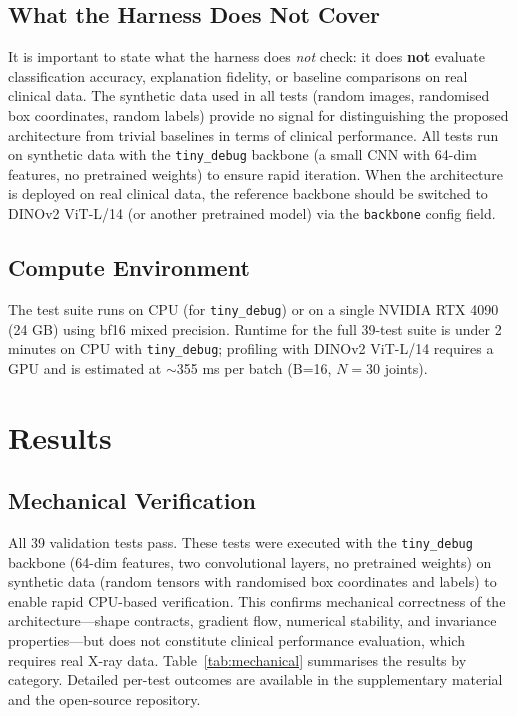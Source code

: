 \documentclass{article}
\begin{document}
\subsection{What the Harness Does Not Cover}
It is important to state what the harness does \emph{not} check: it does \textbf{not} evaluate classification accuracy, explanation fidelity, or baseline comparisons on real clinical data. The synthetic data used in all tests (random images, randomised box coordinates, random labels) provide no signal for distinguishing the proposed architecture from trivial baselines in terms of clinical performance. All tests run on synthetic data with the \texttt{tiny\_debug} backbone (a small CNN with 64-dim features, no pretrained weights) to ensure rapid iteration. When the architecture is deployed on real clinical data, the reference backbone should be switched to DINOv2 ViT-L/14 (or another pretrained model) via the \texttt{backbone} config field.

\subsection{Compute Environment}
The test suite runs on CPU (for \texttt{tiny\_debug}) or on a single NVIDIA RTX 4090 (24 GB) using bf16 mixed precision. Runtime for the full 39-test suite is under 2 minutes on CPU with \texttt{tiny\_debug}; profiling with DINOv2 ViT-L/14 requires a GPU and is estimated at $\sim$355 ms per batch (B=16, $N=30$ joints).

\section{Results}
\label{sec:results}

\subsection{Mechanical Verification}

All 39 validation tests pass. These tests were executed with the \texttt{tiny\_debug} backbone (64-dim features, two convolutional layers, no pretrained weights) on synthetic data (random tensors with randomised box coordinates and labels) to enable rapid CPU-based verification. This confirms mechanical correctness of the architecture---shape contracts, gradient flow, numerical stability, and invariance properties---but does not constitute clinical performance evaluation, which requires real X-ray data. Table~\ref{tab:mechanical} summarises the results by category. Detailed per-test outcomes are available in the supplementary material and the open-source repository.
\end{document}
